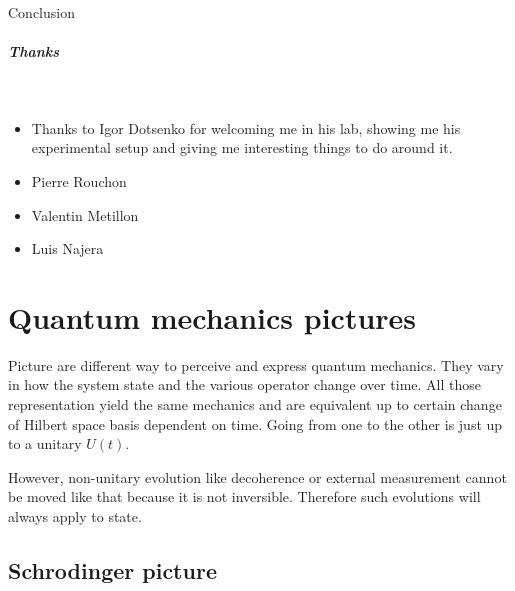 \documentclass[10pt]{report}
\theoremstyle{plain}
\theoremstyle{definition}
\theoremstyle{remark}
\begin{document}
Conclusion



\vfill

\paragraph{\Huge Thanks}

\

\vspace{3mm}

\begin{itemize}

\item Thanks to Igor Dotsenko for welcoming me in his lab, showing me his
  experimental setup and giving me interesting things to do around it.
\item Pierre Rouchon
\item Valentin Metillon
\item Luis Najera

\end{itemize}

\vfill






{\let\clearpage\relax }

\appendix

\chapter{Quantum mechanics pictures}\label{app:pict}

Picture are different way to perceive and express quantum mechanics. They vary
in how the system state and the various operator change over time. All those
representation yield the same mechanics and are equivalent up to certain change
of Hilbert space basis dependent on time. Going from one to the other is just up
to a unitary $U(t)$.

However, non-unitary evolution like decoherence or external measurement
cannot be moved like that because it is not inversible. Therefore such
evolutions will always apply to state.

\section{Schrodinger picture}
\end{document}
